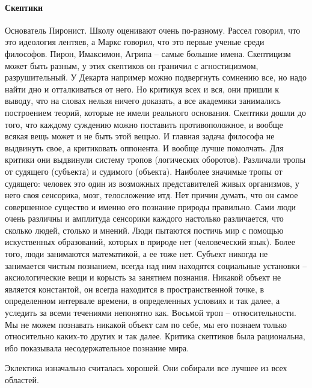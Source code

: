 \documentclass[a4paper, 12pt]{article}
\begin{document}
\paragraph{Скептики} Основатель Пиронист. Школу оценивают очень по-разному. Рассел говорил, что это идеология лентяев, а Маркс говорил, что это первые ученые среди философов. Пирон, Имаксимон, Агрипа -- самые большие имена. Скептицизм может быть разным, у этих скептиков он граничил с агностицизмом, разрушительный. У Декарта например можно подвергнуть сомнению все, но надо найти дно и отталкиваться от него. Но критикуя всех и вся, они пришли к выводу, что на словах нельзя ничего доказать, а все академики занимались построением теорий, которые не имели реального основания. Скептики дошли до того, что каждому суждению можно поставить противоположное, и вообще всякая вещь может и не быть этой вещью. И главная задача философа не выдвинуть свое, а критиковать оппонента. И вообще лучше помолчать. Для критики они выдвинули систему тропов (логических оборотов). Различали тропы от судящего (субъекта) и судимого (объекта). Наиболее значимые тропы от судящего: человек это один из возможных представителей живых организмов, у него своя сенсорика, мозг, телосложение итд. Нет причин думать, что он самое совершенное существо и именно его познание природы правильно. Сами люди очень различны и амплитуда сенсорики каждого настолько различается, что сколько людей, столько и мнений. Люди пытаются постичь мир с помощью искуственных образований, которых в природе нет (человеческий язык). Более того, люди занимаются математикой, а ее тоже нет. Субъект никогда не занимается чистым познанием, всегда над ним находятся социальные установки -- аксиологические вещи и корысть за занятием познания. Никакой объект не является константой, он всегда находится в пространственной точке, в определенном интервале времени, в определенных условиях и так далее, а уследить за всеми течениями непонятно как. Восьмой троп -- относительности. Мы не можем познавать никакой объект сам по себе, мы его познаем только относительно каких-то других и так далее. Критика скептиков была рациональна, ибо показывала несодержательное познание мира. 

Эклектика изначально считалась хорошей. Они собирали все лучшее из всех областей. 
\end{document}
